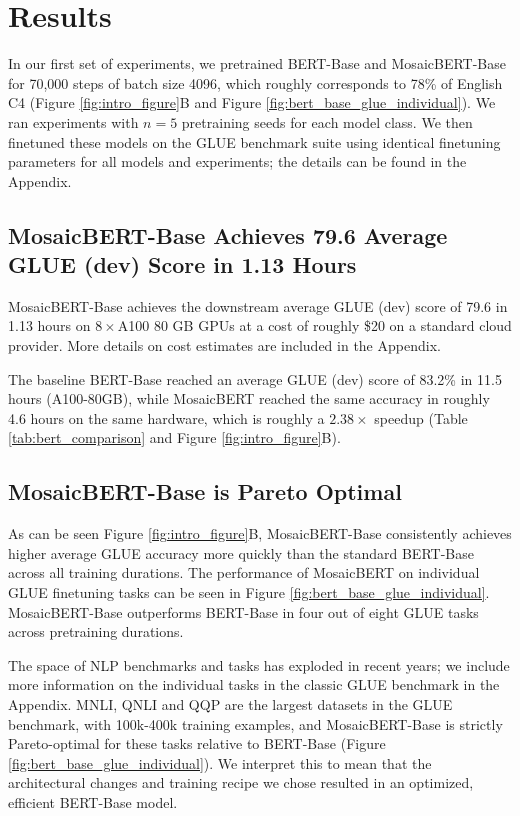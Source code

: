 \documentclass{article}
\begin{document}

\section{Results}

In our first set of experiments, we pretrained BERT-Base and MosaicBERT-Base for 70,000 steps of batch size 4096, which roughly corresponds to 78\% of English C4 (Figure \ref{fig:intro_figure}B and Figure \ref{fig:bert_base_glue_individual}). We ran experiments with $n=5$ pretraining seeds for each model class. We then finetuned these models on the GLUE benchmark suite using identical finetuning parameters for all models and experiments; the details can be found in the Appendix.

\subsection{MosaicBERT-Base Achieves 79.6 Average GLUE (dev) Score in 1.13 Hours}

MosaicBERT-Base achieves the downstream average GLUE (dev) score of 79.6 in 1.13 hours on $8\times$A100 80 GB GPUs at a cost of roughly \$20 on a standard cloud provider. More details on cost estimates are included in the Appendix.

The baseline BERT-Base reached an average GLUE (dev) score of 83.2\% in 11.5 hours (A100-80GB), while MosaicBERT reached the same accuracy in roughly 4.6 hours on the same hardware, which is roughly a $2.38\times$ speedup (Table \ref{tab:bert_comparison} and Figure \ref{fig:intro_figure}B). 

\subsection{MosaicBERT-Base is Pareto Optimal}

As can be seen Figure \ref{fig:intro_figure}B, MosaicBERT-Base consistently achieves higher average GLUE accuracy more quickly than the standard BERT-Base across all training durations. The performance of MosaicBERT on individual GLUE finetuning tasks can be seen in Figure \ref{fig:bert_base_glue_individual}. MosaicBERT-Base outperforms BERT-Base in four out of eight GLUE tasks across pretraining durations. 

The space of NLP benchmarks and tasks has exploded in recent years; we include more information on the individual tasks in the classic GLUE benchmark in the Appendix.
MNLI, QNLI and QQP are the largest datasets in the GLUE benchmark, with 100k-400k training examples, and MosaicBERT-Base is strictly Pareto-optimal for these tasks relative to BERT-Base (Figure \ref{fig:bert_base_glue_individual}). We interpret this to mean that the architectural changes and training recipe we chose resulted in an optimized, efficient BERT-Base model.
\end{document}
